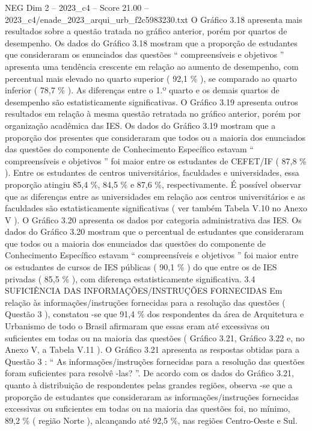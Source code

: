 \begin{textsample}{NEG Dim 2 – 2023\_c4 – Score 21.00 – 2023\_c4/enade\_2023\_arqui\_urb\_f2c5983230.txt}
O Gráfico 3.18 apresenta mais resultados sobre a questão tratada no gráfico anterior, porém por quartos de desempenho.
Os dados do Gráfico 3.18 mostram que a proporção de estudantes que consideraram os enunciados das questões “ compreensíveis e objetivos ” apresenta uma tendência crescente em relação ao aumento de desempenho, com percentual mais elevado no quarto superior ( 92,1 \% ), se comparado ao quarto inferior ( 78,7 \% ).
As diferenças entre o 1.º quarto e os demais quartos de desempenho são estatisticamente significativas.
O Gráfico 3.19 apresenta outros resultados em relação à mesma questão retratada no gráfico anterior, porém por organização acadêmica das IES.
Os dados do Gráfico 3.19 mostram que a proporção dos presentes que consideraram que todos ou a maioria dos enunciados das questões do componente de Conhecimento Específico estavam “ compreensíveis e objetivos ” foi maior entre os estudantes de CEFET/IF ( 87,8 \% ).
Entre os estudantes de centros universitários, faculdades e universidades, essa proporção atingiu 85,4 \%, 84,5 \% e 87,6 \%, respectivamente.
É possível observar que as diferenças entre as universidades em relação aos centros universitários e as faculdades são estatisticamente significativas ( ver também Tabela V.10 no Anexo V ).
O Gráfico 3.20 apresenta os dados por categoria administrativa das IES.
Os dados do Gráfico 3.20 mostram que o percentual de estudantes que consideraram que todos ou a maioria dos enunciados das questões do componente de Conhecimento Específico estavam “ compreensíveis e objetivos ” foi maior entre os estudantes de cursos de IES públicas ( 90,1 \% ) do que entre os de IES privadas ( 85,5 \% ), com diferença estatisticamente significativa. 3.4 SUFICIÊNCIA DAS INFORMAÇÕES/INSTRUÇÕES FORNECIDAS Em relação às informações/instruções fornecidas para a resolução das questões ( Questão 3 ), constatou -se que 91,4 \% dos respondentes da área de Arquitetura e Urbanismo de todo o Brasil afirmaram que essas eram até excessivas ou suficientes em todas ou na maioria das questões ( Gráfico 3.21, Gráfico 3.22 e, no Anexo V, a Tabela V.11 ).
O Gráfico 3.21 apresenta as respostas obtidas para a Questão 3 : “ As informações/instruções fornecidas para a resolução das questões foram suficientes para resolvê -las? ”.
De acordo com os dados do Gráfico 3.21, quanto à distribuição de respondentes pelas grandes regiões, observa -se que a proporção de estudantes que consideraram as informações/instruções fornecidas excessivas ou suficientes em todas ou na maioria das questões foi, no mínimo, 89,2 \% ( região Norte ), alcançando até 92,5 \%, nas regiões Centro-Oeste e Sul.

\end{textsample}
